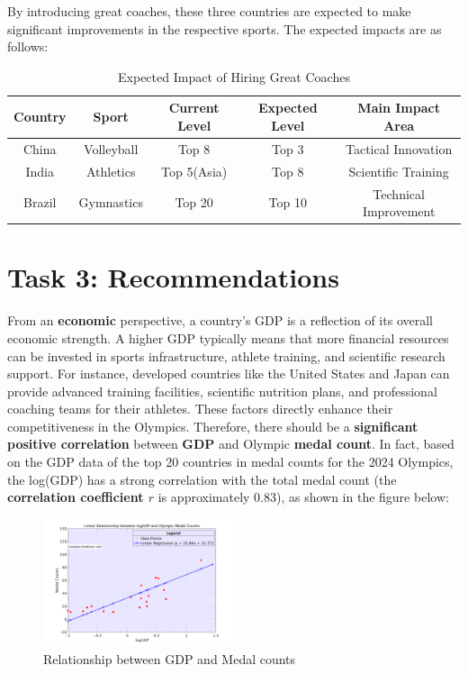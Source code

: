 \documentclass{mcmthesis}  %
\begin{document}
By introducing great coaches, these three countries are expected to make significant improvements in the respective sports. The expected impacts are as follows:

\begin{table}[h]
\centering
\begin{tabular}{|c|c|c|c|c|}
\hline
Country & Sport & Current Level & Expected Level & Main Impact Area \\
\hline
China & Volleyball & Top 8 & Top 3 & Tactical Innovation \\
\hline
India & Athletics & Top 5(Asia) & Top 8 & Scientific Training \\
\hline
Brazil & Gymnastics & Top 20 & Top 10 & Technical Improvement \\
\hline
\end{tabular}
\caption{Expected Impact of Hiring Great Coaches}
\end{table}


\section{Task 3: Recommendations}
From an \textbf{economic} perspective, a country's GDP is a reflection of its overall economic strength. A higher GDP typically means that more financial resources can be invested in sports infrastructure, athlete training, and scientific research support. For instance, developed countries like the United States and Japan can provide advanced training facilities, scientific nutrition plans, and professional coaching teams for their athletes. These factors directly enhance their competitiveness in the Olympics. Therefore, there should be a \textbf{significant positive correlation} between \textbf{GDP} and Olympic \textbf{medal count}. In fact, based on the GDP data of the top 20 countries in medal counts for the 2024 Olympics, the log(GDP) has a strong correlation with the total medal count (the \textbf{correlation coefficient \( r \)} is approximately 0.83), as shown in the figure below:

\begin{figure}[h!]
    \centering
    \includegraphics[width=0.5\textwidth]{image/logGDP.png}  %
    \caption{Relationship between GDP and Medal counts}
    \label{fig:sample-image}
\end{figure}
\end{document}
